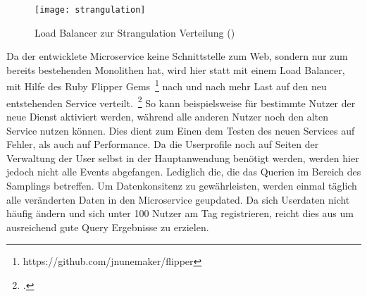 \begin{figure}[h]
    \caption{Load Balancer zur Strangulation Verteilung (\cite{Hammant:Strangler})}
    \texttt{[image: strangulation]}
\end{figure}

Da der entwicklete Microservice keine Schnittstelle zum Web, sondern nur zum bereits bestehenden Monolithen hat, wird hier statt mit einem Load Balancer, mit Hilfe des Ruby Flipper Gems~\footnote{https://github.com/jnunemaker/flipper} nach und nach mehr Last auf den neu entstehenden Service verteilt.~\footcite[vgl.][]{Hammant:Strangler} So kann beispielsweise für bestimmte Nutzer der neue Dienst aktiviert werden, während alle anderen Nutzer noch den alten Service nutzen können. Dies dient zum Einen dem Testen des neuen Services auf Fehler, als auch auf Performance.
Da die Userprofile noch auf Seiten der Verwaltung der User selbst in der Hauptanwendung benötigt werden, werden hier jedoch nicht alle Events abgefangen. Lediglich die, die das Querien im Bereich des Samplings betreffen. Um Datenkonsitenz zu gewährleisten, werden einmal täglich alle veränderten Daten in den Microservice geupdated. Da sich Userdaten nicht häufig ändern und sich unter 100 Nutzer am Tag registrieren, reicht dies aus um ausreichend gute Query Ergebnisse zu erzielen.